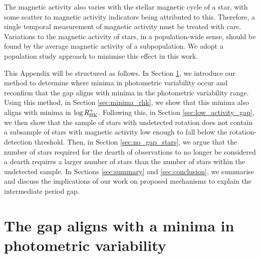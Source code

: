 The magnetic activity also varies with the stellar magnetic cycle of a star, with some scatter to magnetic activity indicators being attributed to this.
Therefore, a single temporal measurement of magnetic activity must be treated with care.
Variations to the magnetic activity of stars, in a population-wide sense, should be found by the average magnetic activity of a subpopulation.
We adopt a population study approach to minimise this effect in this work.

This Appendix will be structured as follows.
In Section \ref{sec:minima_rper}, we introduce our method to determine where minima in photometric variability occur and reconfirm that the gap aligns with minima in the photometric variability range. 
Using this method, in Section \ref{sec:minima_rhk}, we show that this minima also aligns with minima in $\log R^{+}_{\rm{HK}}$.
Following this, in Section \ref{sec:low_activity_gap}, we then show that the sample of stars with undetected rotation does not contain a subsample of stars with magnetic activity low enough to fall below the rotation-detection threshold.
Then, in Section \ref{sec:no_gap_stars}, we argue that the number of stars required for the dearth of observations to no longer be considered a dearth requires a larger number of stars than the number of stars within the undetected sample.
In Sections \ref{sec:summary} and \ref{sec:conclusion}, we summarise and discuss the implications of our work on proposed mechanisms to explain the intermediate period gap.

\section{The gap aligns with a minima in photometric variability}
\label{sec:minima_rper}

